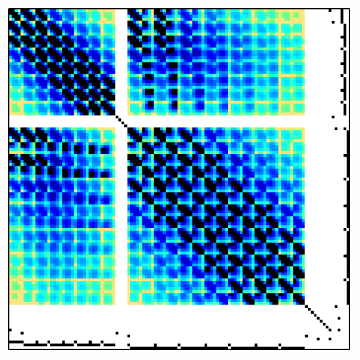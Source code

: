 \begin{figure}[ht!]
\begin{subfigure}[b]{0.48\textwidth}
		\caption{}
		\label{Figure:comparing-decomposers-and-solvers->bddcml-benchmark->matrices-used-for-benchmarks->examples-of-element-patterns-in-matrices->8-4-2-2}
	\end{subfigure}
	
	\begin{subfigure}[b]{0.48\textwidth}
		\centering
		\includegraphics[width=\textwidth]{images/ch03/input-matrices/bddcml-benchmark/poc-8_4_2-3.pdf}
		\caption{}
		\label{Figure:comparing-decomposers-and-solvers->bddcml-benchmark->matrices-used-for-benchmarks->examples-of-element-patterns-in-matrices->8-4-2-3}
	\end{subfigure}%
	\hfill
	\begin{subfigure}[b]{0.48\textwidth}
		\centering

\end{subfigure}
\end{figure}
